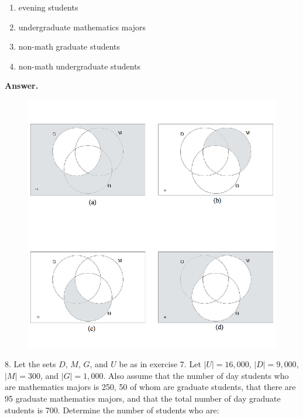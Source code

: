 \documentclass[10pt,]{book}
\theoremstyle{plain}
\theoremstyle{definition}
\theoremstyle{definition}
\theoremstyle{definition}
\theoremstyle{definition}
\begin{document}
\begin{exercisegroup}
\par
\leavevmode%
\begin{multicols}{2}
\begin{enumerate}[label=\alph*]
\item\hypertarget{li-123}{}  evening students %
\item\hypertarget{li-124}{}  undergraduate mathematics majors %
\item\hypertarget{li-125}{}  non-math graduate students %
\item\hypertarget{li-126}{}  non-math undergraduate students%
\end{enumerate}
\end{multicols}
%
\par\smallskip
\par\smallskip
\noindent\textbf{Answer.}\hypertarget{answer-7}{}\quad
\leavevmode%
\begin{figure}
\centering
\includegraphics[width=1\linewidth]{images/fig-sol-1-2-7.png}
\caption{
	 \label{fig-sol-1-2-7}}
\end{figure}
\item[8.]\hypertarget{exercise-14}{} Let the sets \( D\), \( M\), \( G\), and \( U\) be as in exercise 7.  Let \(\lvert U \rvert  = 16,000\), \(\lvert D \rvert = 9,000\), \(|M |=
300\), and \(\lvert G \rvert = 1,000\). Also assume that the number of day students who are mathematics majors is 250, 50 of whom are graduate students, that there are 95 graduate mathematics majors, and that the total number of day graduate students is 700. Determine the number of students who are: %

\end{exercisegroup}
\end{document}
